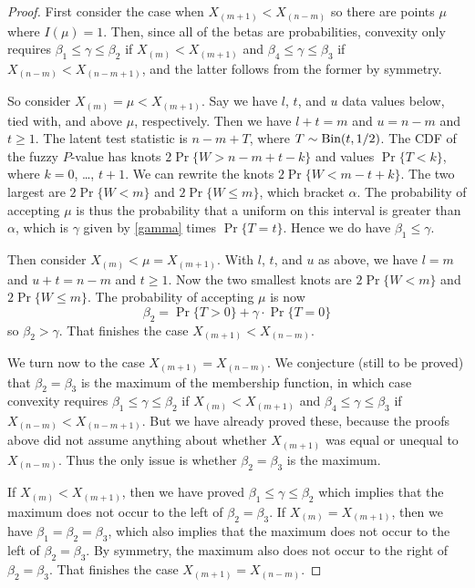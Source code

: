\documentclass{article}
\newcommand{\BinomialDis}{\text{\upshape Bin}}
\begin{document}
\begin{proof}
First consider the case when $X_{(m + 1)} < X_{(n - m)}$ so there are
points $\mu$ where $I(\mu) = 1$.  Then, since all of the betas are
probabilities, convexity only requires
$\beta_1 \le \gamma \le \beta_2$ if $X_{(m)} < X_{(m + 1)}$
and
$\beta_4 \le \gamma \le \beta_3$ if $X_{(n - m)} < X_{(n - m + 1)}$,
and the latter follows from the former by symmetry.

So consider $X_{(m)} = \mu < X_{(m + 1)}$.
Say we have $l$, $t$, and $u$ data values below, tied with, and above
$\mu$, respectively.
Then we have $l + t = m$ and $u = n - m$ and $t \ge 1$.
The latent test statistic is $n - m + T$,
where $T \sim \BinomialDis(t, 1 / 2)$.
The CDF of the fuzzy $P$-value has
knots $2 \Pr\{ W > n - m + t - k \}$ and
values $\Pr\{ T < k \}$, where $k = 0$, \ldots, $t + 1$.
We can rewrite the
knots $2 \Pr\{ W < m - t + k \}$.  The two largest
are $2 \Pr \{ W < m \}$ and $2 \Pr \{ W \le m \}$, which bracket $\alpha$.
The probability of accepting $\mu$ is thus the probability that a uniform
on this interval is greater than $\alpha$, which is $\gamma$ given by
\eqref{gamma} times $\Pr \{ T = t \}$.  Hence we do have $\beta_1 \le \gamma$.

Then consider $X_{(m)} < \mu = X_{(m + 1)}$.
With $l$, $t$, and $u$ as above,
we have $l = m$ and $u + t = n - m$ and $t \ge 1$.
Now the two smallest knots
are $2 \Pr \{ W < m \}$ and $2 \Pr \{ W \le m \}$.
The probability of accepting $\mu$ is now
$$
   \beta_2 = \Pr\{ T > 0 \} + \gamma \cdot \Pr \{ T = 0 \}
$$
so $\beta_2 > \gamma$.
That finishes the case $X_{(m + 1)} < X_{(n - m)}$.

We turn now to the case $X_{(m + 1)} = X_{(n - m)}$.  We conjecture
(still to be proved)
that $\beta_2 = \beta_3$ is the maximum of the membership function,
in which case convexity requires
$\beta_1 \le \gamma \le \beta_2$ if $X_{(m)} < X_{(m + 1)}$
and
$\beta_4 \le \gamma \le \beta_3$ if $X_{(n - m)} < X_{(n - m + 1)}$.
But we have already proved these, because the proofs above did not assume
anything about whether $X_{(m + 1)}$ was equal or unequal to $X_{(n - m)}$.
Thus the only issue is whether $\beta_2 = \beta_3$ is the maximum.

If $X_{(m)} < X_{(m + 1)}$, then we have
proved $\beta_1 \le \gamma \le \beta_2$ which implies that the maximum
does not occur to the left of $\beta_2 = \beta_3$.
If $X_{(m)} = X_{(m + 1)}$, then we have $\beta_1 = \beta_2 = \beta_3$,
which also implies that the maximum
does not occur to the left of $\beta_2 = \beta_3$.
By symmetry, the maximum also
does not occur to the right of $\beta_2 = \beta_3$.
That finishes the case $X_{(m + 1)} = X_{(n - m)}$.


\end{proof}
\end{document}

